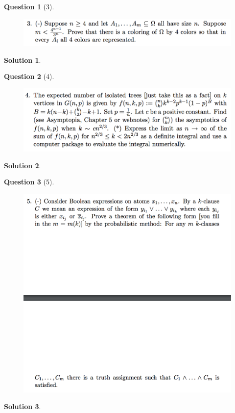 \documentclass{article} %
\theoremstyle{quest}
\newtheorem*{question}{Question}
\newtheorem*{solution}{Solution}
\begin{document}
\bigskip

\begin{question}[3]
\hfill
\begin{figure}[h!]
  \centering
    \includegraphics[width=1\textwidth]{pm-1-3.png}
\end{figure}
\end{question}
\begin{solution}
\end{solution}
\bigskip

\begin{question}[4]
\hfill
\begin{figure}[h!]
  \centering
    \includegraphics[width=1\textwidth]{pm-1-4.png}
\end{figure}
\end{question}
\begin{solution}
\end{solution}

\pagebreak

\begin{question}[5]
\hfill
\begin{figure}[h!]
  \centering
    \includegraphics[width=1\textwidth]{pm-1-5.png}
\end{figure}
\end{question}
\begin{solution} 

 
\end{solution}
\end{document}

